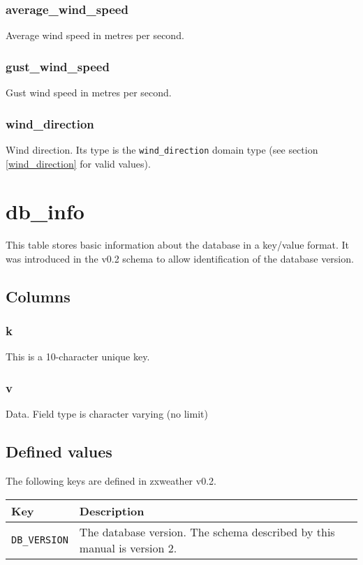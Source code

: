 \documentclass[a4paper,10pt]{book}
\begin{document}
\subsubsection{average\_wind\_speed}
Average wind speed in metres per second.

\subsubsection{gust\_wind\_speed}
Gust wind speed in metres per second.

\subsubsection{wind\_direction}
Wind direction. Its type is the \verb|wind_direction| domain type (see section \ref{wind_direction} for valid values).

\section{db\_info}
\label{tbl_db_info}
This table stores basic information about the database in a key/value format. It was introduced in the v0.2 schema to allow identification of the database version.

\subsection{Columns}
\subsubsection{k}
This is a 10-character unique key.

\subsubsection{v}
Data. Field type is character varying (no limit)

\subsection{Defined values}
The following keys are defined in zxweather v0.2.

\begin{tabular}{l l}
\hline
\textbf{Key} & \textbf{Description} \\
\hline
\verb|DB_VERSION| & The database version. The schema described by this manual is version 2. \\
\hline
\end{tabular}
\end{document}
